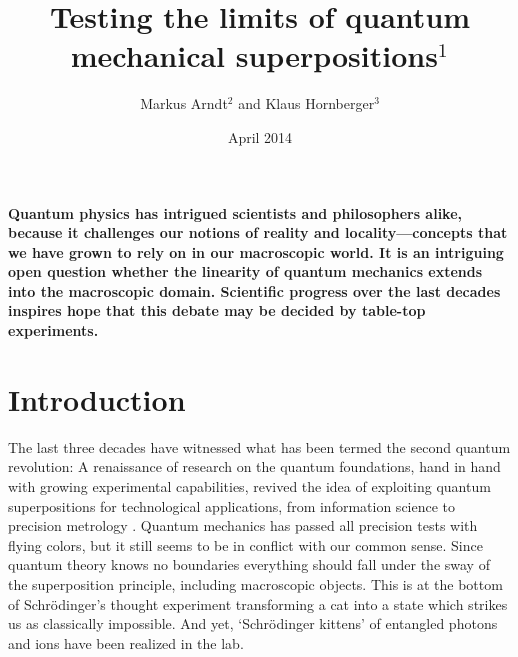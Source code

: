 \documentclass[11pt]{article}
\begin{document}
\title{\Large\bfseries\sffamily Testing the limits of quantum mechanical superpositions$^1$}

\author{Markus Arndt$^{2}$  and Klaus Hornberger$^3$}
\date{April 2014}
\maketitle
\noindent
\textbf{Quantum physics has intrigued scientists and philosophers alike, because
it challenges our notions of reality and 
locality---concepts that we have
grown to rely on in our macroscopic world. 
It is an intriguing  open question
whether the linearity of quantum mechanics extends into
the macroscopic domain.
Scientific progress over the last decades inspires hope that this
debate may be decided by table-top experiments.}


\section{Introduction}
\noindent 
The last three decades have witnessed
what has been termed \cite{Dowling2003} the second quantum revolution:
A renaissance of research on the quantum foundations,
hand in hand with growing experimental capabilities\cite{Zeilinger1999},
revived the idea of  {exploiting quantum superpositions} 
for 
technological applications, from information science \cite{Trabesinger2012,Bennett2000,Southwell2008}
to precision metrology \cite{Giovannetti2011,Riedel2010,Gross2010}.
Quantum mechanics has passed all precision tests with flying colors, but it still seems to be in conflict with our common sense. Since quantum theory knows no boundaries everything should fall under the sway of the superposition principle, including macroscopic objects. This is at the bottom of Schr{\"o}dinger's thought experiment transforming a cat into a state which strikes us as classically impossible. And yet, `Schr{\"o}dinger kittens' of entangled photons\cite{Haroche2013} and ions\cite{Wineland2013} have been realized in the lab.
\end{document}
